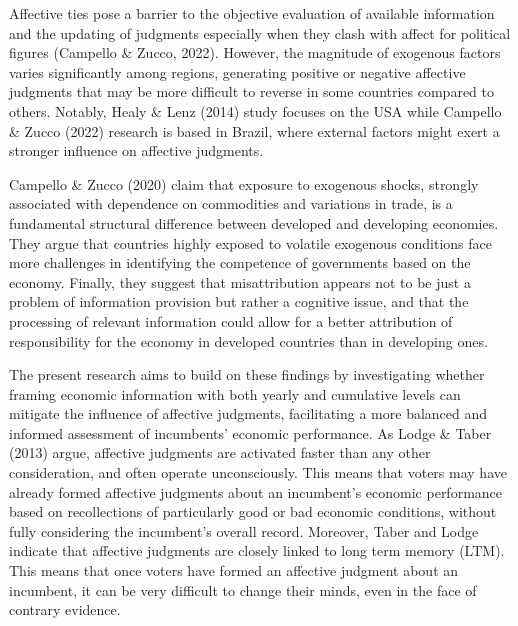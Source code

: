 \documentclass[
]{article}
\begin{document}
Affective ties pose a barrier to the objective evaluation of available
information and the updating of judgments especially when they clash
with affect for political figures (Campello \& Zucco, 2022). However,
the magnitude of exogenous factors varies significantly among regions,
generating positive or negative affective judgments that may be more
difficult to reverse in some countries compared to others. Notably,
Healy \& Lenz (2014) study focuses on the USA while Campello \& Zucco
(2022) research is based in Brazil, where external factors might exert a
stronger influence on affective judgments.

Campello \& Zucco (2020) claim that exposure to exogenous shocks,
strongly associated with dependence on commodities and variations in
trade, is a fundamental structural difference between developed and
developing economies. They argue that countries highly exposed to
volatile exogenous conditions face more challenges in identifying the
competence of governments based on the economy. Finally, they suggest
that misattribution appears not to be just a problem of information
provision but rather a cognitive issue, and that the processing of
relevant information could allow for a better attribution of
responsibility for the economy in developed countries than in developing
ones.

The present research aims to build on these findings by investigating
whether framing economic information with both yearly and cumulative
levels can mitigate the influence of affective judgments, facilitating a
more balanced and informed assessment of incumbents' economic
performance. As Lodge \& Taber (2013) argue, affective judgments are
activated faster than any other consideration, and often operate
unconsciously. This means that voters may have already formed affective
judgments about an incumbent's economic performance based on
recollections of particularly good or bad economic conditions, without
fully considering the incumbent's overall record. Moreover, Taber and
Lodge indicate that affective judgments are closely linked to long term
memory (LTM). This means that once voters have formed an affective
judgment about an incumbent, it can be very difficult to change their
minds, even in the face of contrary evidence.
\end{document}
